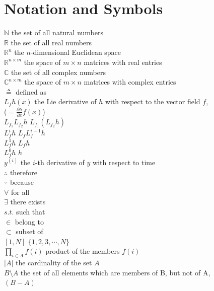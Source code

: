 \documentclass[11pt, a4paper, oneside, openany, reqno]{book}
\theoremstyle{definition}
\theoremstyle{remark}
\numberwithin{equation}{chapter} %
\newcommand{\R}{\ensuremath{{\mathbb R}}}
\newcommand{\N}{\ensuremath{{\mathbb N}}}
\newcommand{\C}{\ensuremath{{\mathbb C}}}
\begin{document}
\chapter*{Notation and Symbols}
\begin{tabbing}
	$ \N $ \qquad\qquad\qquad\qquad  \= the set of all natural numbers\\
	$ \R $  \> the set of all real numbers\\
	$ \R^n $ \> the $ n $-dimensional Euclidean space\\
	$ \R^{n \times m} $  \> the space of $ m \times n $ matrices with real entries\\
	$ \C $  \> the set of all complex numbers\\
	$ \C^{n \times m} $  \> the space of $ m \times n $ matrices with complex entries\\
	$ \triangleq $  \> defined as \\
	$ L_f h(x)$ \> the Lie derivative of $h$ with respect to the vector field $f$,\\ 
	\> ($=\frac{\partial h}{\partial x} f(x)$) \\
	$ L_{f_1}L_{f_2}h $ \> $L_{f_1}(L_{f_2}h)$ \\
	$ L_f^i h $ \> $L_f L_f^{i-1} h $ \\ 
	$ L_f^1 h $ \> $L_f h $ \\
	$ L_f^0 h $ \> $h $ \\
	$ y^{(i)} $ \> the $ i $-th derivative of $ y $ with respect to time\\
	$ \therefore $ \> therefore \\
	$ \because  $ \> because \\
	$ \forall $ \> for all\\
	$ \exists $ \> there exists \\
	$ s.t. $ \> such that \\
	$ \in $ \> belong to\\
	$ \subset $ \> subset of\\
	$ \left[ 1 ,N \right] $ \> $\lbrace 1,2,3,\cdots, N \rbrace $\\
	$ \prod_{i \in A}f(i) $ \> product of the members $ f(i) $ \\
	$ \vert A \vert $ \> the cardinality of the set $ A $\\
	$ B \setminus A $ \> the set of all elements which are members of B, but not of A,\\ \> $(B-A)$\\

\end{tabbing}
\end{document}
